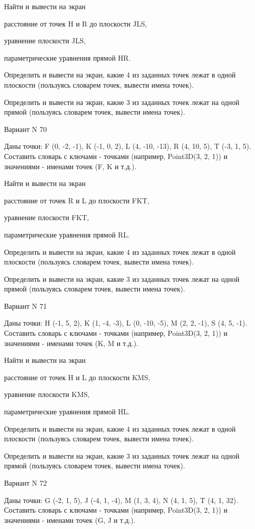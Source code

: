 \documentclass[11pt]{report}
\begin{document}
Найти и вывести на экран


расстояние от точек H и R до плоскости JLS,


уравнение плоскости JLS,


параметрические уравнения прямой HR.


Определить и вывести на экран, какие 4 из заданных точек лежат в одной плоскости (пользуясь словарем точек, вывести имена точек).


Определить и вывести на экран, какие 3 из заданных точек лежат на одной прямой (пользуясь словарем точек, вывести имена точек).

\newpage
Вариант N 70

Даны точки: F (0, -2, -1), K (-1, 0, 2), L (4, -10, -13), R (4, 10, 5), T (-3, 1, 5).
Составить словарь с ключами - точками (например, Point3D(3, 2, 1)) и значениями - именами точек (F, K и т.д.).


Найти и вывести на экран


расстояние от точек R и L до плоскости FKT,


уравнение плоскости FKT,


параметрические уравнения прямой RL.


Определить и вывести на экран, какие 4 из заданных точек лежат в одной плоскости (пользуясь словарем точек, вывести имена точек).


Определить и вывести на экран, какие 3 из заданных точек лежат на одной прямой (пользуясь словарем точек, вывести имена точек).

\newpage
Вариант N 71

Даны точки: H (-1, 5, 2), K (1, -4, -3), L (0, -10, -5), M (2, 2, -1), S (4, 5, -1).
Составить словарь с ключами - точками (например, Point3D(3, 2, 1)) и значениями - именами точек (K, M и т.д.).


Найти и вывести на экран


расстояние от точек H и L до плоскости KMS,


уравнение плоскости KMS,


параметрические уравнения прямой HL.


Определить и вывести на экран, какие 4 из заданных точек лежат в одной плоскости (пользуясь словарем точек, вывести имена точек).


Определить и вывести на экран, какие 3 из заданных точек лежат на одной прямой (пользуясь словарем точек, вывести имена точек).

\newpage
Вариант N 72

Даны точки: G (-2, 1, 5), J (-4, 1, -4), M (1, 3, 4), N (4, 1, 5), T (4, 1, 32).
Составить словарь с ключами - точками (например, Point3D(3, 2, 1)) и значениями - именами точек (G, J и т.д.).
\end{document}

